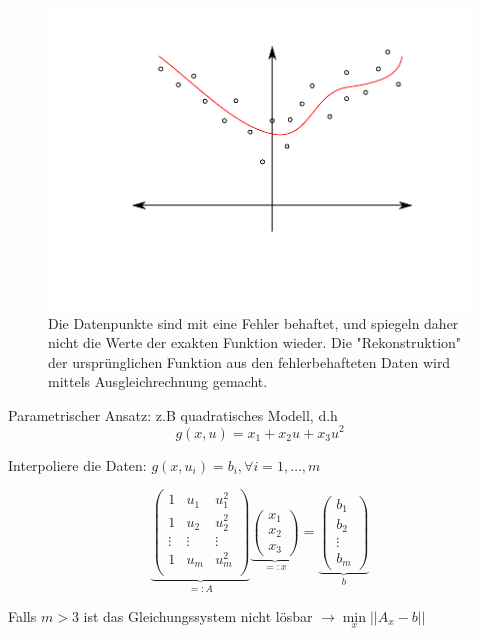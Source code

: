 \documentclass[10pt,a4paper]{article}
\begin{document}
\begin{figure}[H]
\includegraphics[width=\textwidth]{images/ausgleichsproblem}
\caption{Die Datenpunkte sind mit eine Fehler behaftet, und spiegeln daher nicht die Werte der exakten Funktion wieder.  Die "Rekonstruktion" der ursprünglichen Funktion aus den fehlerbehafteten Daten wird mittels Ausgleichrechnung gemacht.}
\end{figure}

Parametrischer Ansatz: z.B quadratisches Modell, d.h $$g(x,u)=x_1  +x_2u + x_3u^{2}$$

Interpoliere die Daten: $g(x,u_i)=b_i, \forall i=1,\ldots, m$

$$\underbrace{\begin{pmatrix}
1 & u_1 &u_1^{2} \\
1 & u_2 &u_2^{2} \\
\vdots & \vdots & \vdots \\
1 & u_m &u_m^{2} \\
\end{pmatrix}}_{=:A} \underbrace{\begin{pmatrix}
x_1 \\x_2 \\x_3 
\end{pmatrix}}_{=:x} = \underbrace{\begin{pmatrix}
b_1 \\b_2 \\ \vdots \\b_m
\end{pmatrix}}_{b}
$$

Falls $m>3$ ist das Gleichungssystem nicht lösbar $\rightarrow \min\limits_{x} ||A_x-b||$
\end{document}
